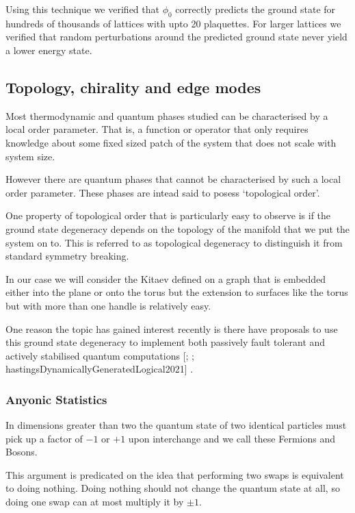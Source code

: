 Using this technique we verified that \(\phi_0\) correctly predicts the
ground state for hundreds of thousands of lattices with upto 20
plaquettes. For larger lattices we verified that random perturbations
around the predicted ground state never yield a lower energy state.

\hypertarget{topology-chirality-and-edge-modes}{%
\subsection{Topology, chirality and edge
modes}\label{topology-chirality-and-edge-modes}}

Most thermodynamic and quantum phases studied can be characterised by a
local order parameter. That is, a function or operator that only
requires knowledge about some fixed sized patch of the system that does
not scale with system size.

However there are quantum phases that cannot be characterised by such a
local order parameter. These phases are intead said to posess
`topological order'.

One property of topological order that is particularly easy to observe
is if the ground state degeneracy depends on the topology of the
manifold that we put the system on to. This is referred to as
topological degeneracy to distinguish it from standard symmetry
breaking.

In our case we will consider the Kitaev defined on a graph that is
embedded either into the plane or onto the torus but the extension to
surfaces like the torus but with more than one handle is relatively
easy.

One reason the topic has gained interest recently is there have
proposals to use this ground state degeneracy to implement both
passively fault tolerant and actively stabilised quantum computations
{[}\textcite{kitaevFaulttolerantQuantumComputation2003};
\textcite{poulinStabilizerFormalismOperator2005};
hastingsDynamicallyGeneratedLogical2021{]} .

\hypertarget{anyonic-statistics}{%
\subsubsection{Anyonic Statistics}\label{anyonic-statistics}}

In dimensions greater than two the quantum state of two identical
particles must pick up a factor of \(-1\) or \(+1\) upon interchange and
we call these Fermions and Bosons.

This argument is predicated on the idea that performing two swaps is
equivalent to doing nothing. Doing nothing should not change the quantum
state at all, so doing one swap can at most multiply it by \(\pm 1\).

